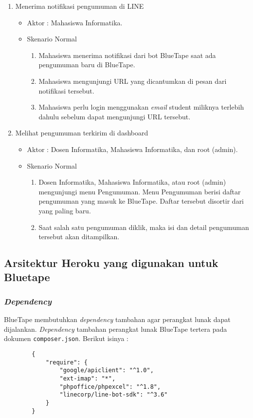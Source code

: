 \begin{enumerate}
\item Menerima notifikasi pengumuman di LINE

\begin{itemize}
	\item Aktor : Mahasiswa Informatika.
	\item Skenario Normal

	\begin{enumerate}
		\item Mahasiswa menerima notifikasi dari bot BlueTape saat ada pengumuman baru di BlueTape.
		\item Mahasiswa mengunjungi URL yang dicantumkan di pesan dari notifikasi tersebut. 
		\item Mahasiswa perlu login menggunakan \textit{email} student miliknya terlebih dahulu sebelum dapat mengunjungi URL tersebut.
	\end{enumerate}
\end{itemize}

\item Melihat pengumuman terkirim di dashboard

\begin{itemize}
	\item Aktor : Dosen Informatika, Mahasiswa Informatika, dan root (admin).
	\item Skenario Normal

	\begin{enumerate}
		\item Dosen Informatika, Mahasiswa Informatika, atau root (admin) mengunjungi menu Pengumuman. Menu Pengumuman berisi daftar pengumuman yang masuk ke BlueTape. Daftar tersebut disortir dari yang paling baru.
		\item Saat salah satu pengumuman diklik, maka isi dan detail pengumuman tersebut akan ditampilkan.
	\end{enumerate}
\end{itemize}
\end{enumerate}

\subsection{Arsitektur Heroku yang digunakan untuk Bluetape}
	\subsubsection{\textit{Dependency}}
		BlueTape membutuhkan \textit{dependency} tambahan agar perangkat lunak dapat dijalankan. \textit{Dependency} tambahan perangkat lunak BlueTape tertera pada dokumen \texttt{composer.json}. Berikut isinya :
		\begin{lstlisting}
		{
		    "require": {
		        "google/apiclient": "^1.0",
				"ext-imap": "*",
		        "phpoffice/phpexcel": "^1.8",
		        "linecorp/line-bot-sdk": "^3.6"
		    }
		}
		\end{lstlisting}
		
